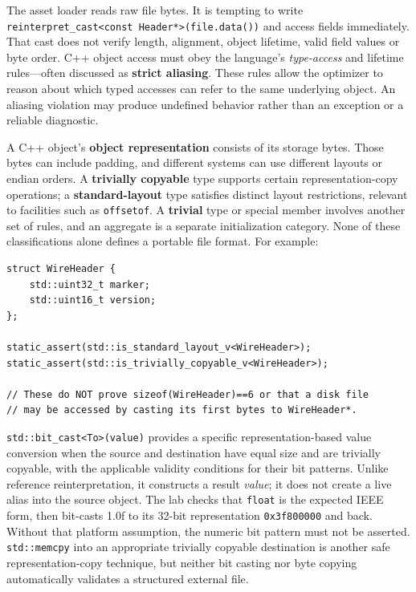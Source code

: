 \hypertarget{05-engine-i-ch004-a-file-is-a-sequence-of-bytes-not-an-object-of-the-type-we-wish-were-there}{}

The asset loader reads raw file bytes. It is tempting to write \texttt{reinterpret\_cast\textless{}const\ Header*\textgreater{}(file.data())} and access fields immediately. That cast does not verify length, alignment, object lifetime, valid field values or byte order. C++ object access must obey the language's \emph{type-access} and lifetime rules---often discussed as \textbf{strict aliasing}. These rules allow the optimizer to reason about which typed accesses can refer to the same underlying object. An aliasing violation may produce undefined behavior rather than an exception or a reliable diagnostic.

A C++ object's \textbf{object representation} consists of its storage bytes. Those bytes can include padding, and different systems can use different layouts or endian orders. A \textbf{trivially copyable} type supports certain representation-copy operations; a \textbf{standard-layout} type satisfies distinct layout restrictions, relevant to facilities such as \texttt{offsetof}. A \textbf{trivial} type or special member involves another set of rules, and an aggregate is a separate initialization category. None of these classifications alone defines a portable file format. For example:

\begin{verbatim}
struct WireHeader {
    std::uint32_t marker;
    std::uint16_t version;
};

static_assert(std::is_standard_layout_v<WireHeader>);
static_assert(std::is_trivially_copyable_v<WireHeader>);

// These do NOT prove sizeof(WireHeader)==6 or that a disk file
// may be accessed by casting its first bytes to WireHeader*.
\end{verbatim}

\texttt{std::bit\_cast\textless{}To\textgreater{}(value)} provides a specific representation-based value conversion when the source and destination have equal size and are trivially copyable, with the applicable validity conditions for their bit patterns. Unlike reference reinterpretation, it constructs a result \emph{value}; it does not create a live alias into the source object. The lab checks that \texttt{float} is the expected IEEE form, then bit-casts 1.0f to its 32-bit representation \texttt{0x3f800000} and back. Without that platform assumption, the numeric bit pattern must not be asserted. \texttt{std::memcpy} into an appropriate trivially copyable destination is another safe representation-copy technique, but neither bit casting nor byte copying automatically validates a structured external file.

